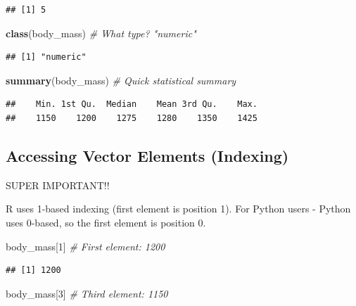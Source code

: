 \documentclass[
]{article}
\newenvironment{Shaded}{\begin{snugshade}}{\end{snugshade}}
\newcommand{\CommentTok}[1]{\textcolor[rgb]{0.56,0.35,0.01}{\textit{#1}}}
\newcommand{\DecValTok}[1]{\textcolor[rgb]{0.00,0.00,0.81}{#1}}
\newcommand{\FunctionTok}[1]{\textcolor[rgb]{0.13,0.29,0.53}{\textbf{#1}}}
\newcommand{\NormalTok}[1]{#1}
\begin{document}
\begin{verbatim}
## [1] 5
\end{verbatim}

\begin{Shaded}
\begin{Highlighting}[]
\FunctionTok{class}\NormalTok{(body\_mass)      }\CommentTok{\# What type? "numeric"}
\end{Highlighting}
\end{Shaded}

\begin{verbatim}
## [1] "numeric"
\end{verbatim}

\begin{Shaded}
\begin{Highlighting}[]
\FunctionTok{summary}\NormalTok{(body\_mass)    }\CommentTok{\# Quick statistical summary}
\end{Highlighting}
\end{Shaded}

\begin{verbatim}
##    Min. 1st Qu.  Median    Mean 3rd Qu.    Max. 
##    1150    1200    1275    1280    1350    1425
\end{verbatim}

\subsection{Accessing Vector Elements
(Indexing)}\label{accessing-vector-elements-indexing}

SUPER IMPORTANT!!

R uses 1-based indexing (first element is position 1). For Python users
- Python uses 0-based, so the first element is position 0.

\begin{Shaded}
\begin{Highlighting}[]
\NormalTok{body\_mass[}\DecValTok{1}\NormalTok{]          }\CommentTok{\# First element: 1200}
\end{Highlighting}
\end{Shaded}

\begin{verbatim}
## [1] 1200
\end{verbatim}

\begin{Shaded}
\begin{Highlighting}[]
\NormalTok{body\_mass[}\DecValTok{3}\NormalTok{]          }\CommentTok{\# Third element: 1150}
\end{Highlighting}
\end{Shaded}
\end{document}

